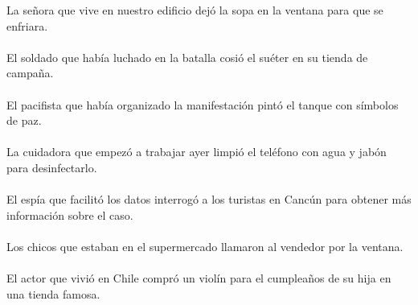 La señora que vive en nuestro edificio dejó la sopa en la ventana para que se enfriara.	\\	\\
El soldado que había luchado en la batalla cosió el suéter en su tienda de campaña.	\\	\\
El pacifista que había organizado la manifestación pintó el tanque con símbolos de paz.	\\	\\
La cuidadora que empezó a trabajar ayer limpió el teléfono con agua y jabón para desinfectarlo.	\\	\\
El espía que facilitó los datos interrogó a los turistas en Cancún para obtener más información sobre el caso.	\\	\\
Los chicos que estaban en el supermercado llamaron al vendedor por la ventana.	\\	\\
El actor que vivió en Chile compró un violín para el cumpleaños de su hija en una tienda famosa.	\\	\\

